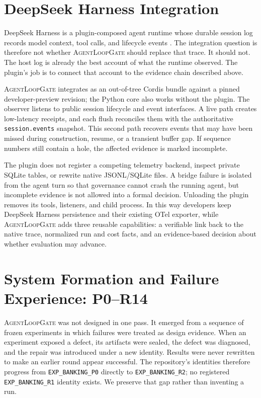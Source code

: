 \documentclass[10pt,twocolumn]{article}
\newcommand{\system}{\textsc{AgentLoopGate}\xspace}
\newcommand{\code}[1]{\texttt{#1}}
\begin{document}
\section{DeepSeek Harness Integration}

DeepSeek Harness is a plugin-composed agent runtime whose durable session log
records model context, tool calls, and lifecycle events
\cite{deepseekharness2026}. The integration question is therefore not whether
\system should replace that trace. It should not. The host log is already the
best account of what the runtime observed. The plugin's job is to connect that
account to the evidence chain described above.

\system integrates as an out-of-tree Cordis bundle against a pinned
developer-preview revision; the Python core also works without the plugin. The
observer listens to public session lifecycle and event interfaces. A live path
creates low-latency receipts, and each flush reconciles them with the
authoritative \code{session.events} snapshot. This second path recovers events
that may have been missed during construction, resume, or a transient buffer
gap. If sequence numbers still contain a hole, the affected evidence is marked
incomplete.

The plugin does not register a competing telemetry backend, inspect private
SQLite tables, or rewrite native JSONL/SQLite files. A bridge failure is
isolated from the agent turn so that governance cannot crash the running agent,
but incomplete evidence is not allowed into a formal decision. Unloading the
plugin removes its tools, listeners, and child process. In this way developers
keep DeepSeek Harness persistence and their existing OTel exporter, while
\system adds three reusable capabilities: a verifiable link back to the native
trace, normalized run and cost facts, and an evidence-based decision about
whether evaluation may advance.

\section{System Formation and Failure Experience: P0--R14}

\system was not designed in one pass. It emerged from a sequence of frozen
experiments in which failures were treated as design evidence. When an
experiment exposed a defect, its artifacts were sealed, the defect was
diagnosed, and the repair was introduced under a new identity. Results were
never rewritten to make an earlier round appear successful. The repository's
identities therefore progress from \code{EXP\_BANKING\_P0} directly to
\code{EXP\_BANKING\_R2}; no registered \code{EXP\_BANKING\_R1} identity exists.
We preserve that gap rather than inventing a run.
\end{document}
